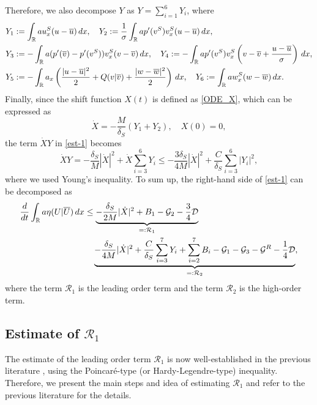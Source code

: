 \documentclass[11pt,reqno]{amsart}
\begin{document}
    Therefore, we also decompose $Y$ as $Y= \sum_{i=1}^6 Y_{i}$, where
    \begin{align*}
    Y_1 &:=\int_\mathbb{R} a u^S_x (u-\overline{u}) \,dx,\quad Y_2:=\frac{1}{\sigma}\int_\mathbb{R} a p'(v^S)v^S_x (u-\overline{u}) \,dx,\\
    Y_3 &:=-\int_\mathbb{R} a (p'(\overline{v})-p'(v^S)) v^S_x (v-\overline{v}) \, dx, \quad Y_4 :=-\int_\mathbb{R} a p'(v^S)v^S_x \left(v-\overline{v}+\frac{u-\overline{u}}{\sigma}\right) \, dx, \\
    Y_5 &:=-\int_{\mathbb{R}} a_x \left( \frac{|u-\overline{u}|^2}{2} + Q(v|\overline{v}) +\frac{|w-\overline{w}|^2}{2} \right) \, dx,\quad  Y_6 := \int_\mathbb{R} a w^S_x (w-\overline{w}) \, dx.
    \end{align*}
    Finally, since the shift function $X(t)$ is defined as \eqref{ODE_X}, which can be expressed as  
    \begin{equation*}
    \dot{X} = -\frac{M}{\delta_S}(Y_{1}+Y_{2}),\quad X(0)=0,
    \end{equation*}
    the term $\dot{X}Y$ in \eqref{est-1} becomes
    \[\dot{X}Y= -\frac{\delta_S}{M}|\dot{X}|^2+\dot{X}\sum_{i=3}^6Y_{i}\le -\frac{3\delta_S}{4M}|\dot{X}|^2+\frac{C}{\delta_S}\sum_{i=3}^6 |Y_i|^2,\]
    where we used Young's inequality. To sum up, the right-hand side of \eqref{est-1} can be decomposed as
    \begin{align}
    \begin{aligned}\label{est}
    \frac{d}{dt}\int_{\mathbb R}a\eta(U|\overline{U})\,dx 
    &\le \underbrace{-\frac{\delta_S}{2M}|\dot{X}|^2 + B_1 -\mathcal{G}_2-\frac{3}{4}\mathcal{D}}_{=: \mathcal{R}_1}\\
    &\quad \underbrace{-\frac{\delta_S}{4M}|\dot{X}|^2 + \frac{C}{\delta_S}\sum_{i=3}^7Y_{i} +\sum_{i=2}^7B_i -\mathcal{G}_1-\mathcal{G}_3-\mathcal{G}^R-\frac{1}{4}\mathcal{D}}_{=:\mathcal{R}_2},
    \end{aligned}
    \end{align}
    where the term $\mathcal{R}_1$ is the leading order term and the term $\mathcal{R}_2$ is the high-order term.

    \subsection{Estimate of $\mathcal{R}_1$} \label{Est-main-part} 
	The estimate of the leading order term $\mathcal{R}_1$ is now well-established in the previous literature \cite{HKKL_pre,KVW23}, using the Poincar\'e-type (or Hardy-Legendre-type) inequality. Therefore, we present the main steps and idea of estimating $\mathcal{R}_1$ and refer to the previous literature for the details. 
	
\end{document}
